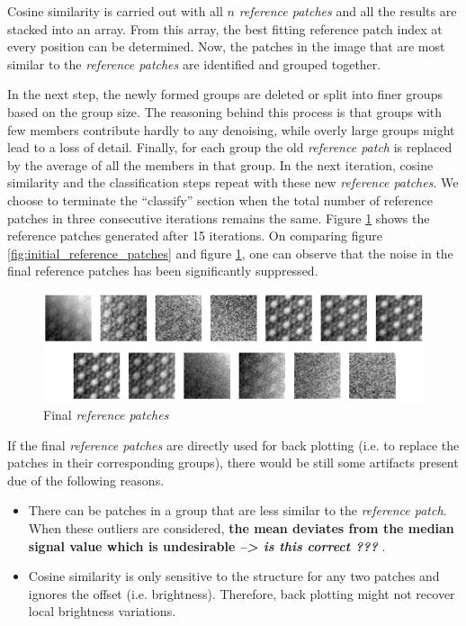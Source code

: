 \documentclass[fleqn,10pt]{wlscirep}
\begin{document}
	Cosine similarity is carried out with all $n$ \textit{reference patches} and all the results are stacked into an array. From this array, the best fitting reference patch index at every position can be determined. Now, the patches in the image that are most similar to the \textit{reference patches} are identified and grouped together.   
	
	In the next step, the newly formed groups are deleted or split into finer groups based on the group size. The reasoning behind this process is that groups with few members contribute hardly to any denoising, while overly large groups might lead to a loss of detail.  Finally, for each group the old \textit{reference patch} is replaced by the average of all the members in that group. In the next iteration, cosine similarity and the classification steps repeat with these new \textit{reference patches}. We choose to terminate the “classify” section when the total number of reference patches in three consecutive iterations remains the same. Figure \ref{fig:final_reference_patches} shows the reference patches generated after 15 iterations. On comparing figure \ref{fig:initial_reference_patches} and figure \ref{fig:final_reference_patches}, one can observe that the noise in the final reference patches has been significantly suppressed.

	
	\begin{figure}
		\centering
		\includegraphics[scale=0.8]{./imgs/final_reference_patches.png}
		\caption{Final \textit{reference patches}}
		\label{fig:final_reference_patches}
	\end{figure} 
	
	If the final \textit{reference patches} are directly used for back plotting (i.e. to replace the patches in their corresponding groups), there would be still some artifacts present due of the following reasons. 
	
	
	\begin{itemize}
		\item There can be patches in a group that are less similar to the \textit{reference patch}. When these outliers are considered, \textbf{the mean deviates from the median signal value which is undesirable} \textit{\textbf{--> is this correct ???}} . 
		\item Cosine similarity is only sensitive to the structure for any two patches and ignores the offset (i.e. brightness). Therefore, back plotting might not recover local brightness variations.
	\end{itemize}
	
\end{document}
